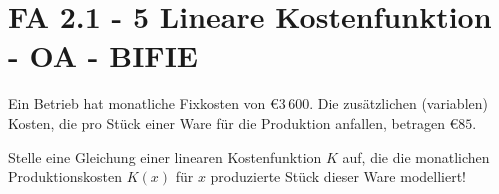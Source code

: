 \section{FA 2.1 - 5 Lineare Kostenfunktion - OA - BIFIE}

\begin{beispiel}[FA 2.1]{1} %
Ein Betrieb hat monatliche Fixkosten von \euro $3\,600$. Die zusätzlichen (variablen) Kosten, die pro Stück einer Ware für die Produktion anfallen, betragen \euro $85$.

Stelle eine Gleichung einer linearen Kostenfunktion $K$ auf, die die monatlichen Produktionskosten $K(x)$ für $x$ produzierte Stück dieser Ware modelliert!
\leer

\end{beispiel}